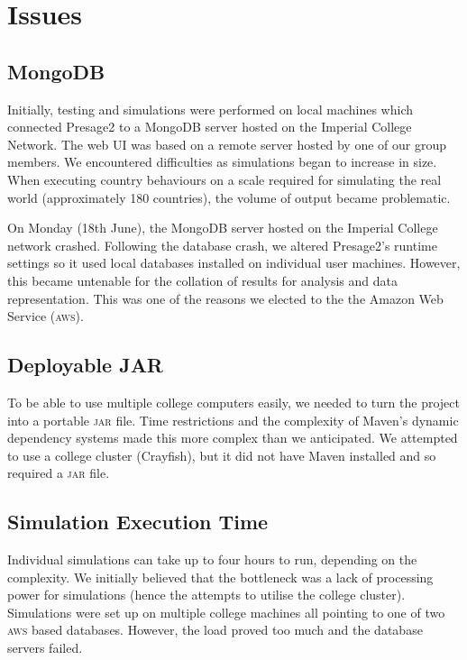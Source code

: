 \section{Issues}

\subsection{MongoDB}

Initially, testing and simulations were performed on local machines which connected Presage2 to a MongoDB server hosted on the Imperial College Network. The web UI was based on a remote server hosted by one of our group members. We encountered difficulties as simulations began to increase in size. When executing country behaviours on a scale required for simulating the real world (approximately 180 countries), the volume of output became problematic.

On Monday (18th June), the MongoDB server hosted on the Imperial College network crashed. Following the database crash, we altered Presage2's runtime settings so it used local databases installed on individual user machines. However, this became untenable for the collation of results for analysis and data representation. This was one of the reasons we elected to the the Amazon Web Service (\textsc{aws}).

\subsection{Deployable JAR}

To be able to use multiple college computers easily, we needed to turn the project into a portable \textsc{jar} file. Time restrictions and the complexity of Maven's dynamic dependency systems made this more complex than we anticipated.  We attempted to use a college cluster (Crayfish), but it did not have Maven installed and so required a \textsc{jar} file.

\subsection{Simulation Execution Time}

Individual simulations can take up to four hours to run, depending on the complexity. We initially believed that the bottleneck was a lack of processing power for simulations (hence the attempts to utilise the college cluster).  Simulations were set up on multiple college machines all pointing to one of two \textsc{aws} based databases.  However, the load proved too much and the database servers failed.

